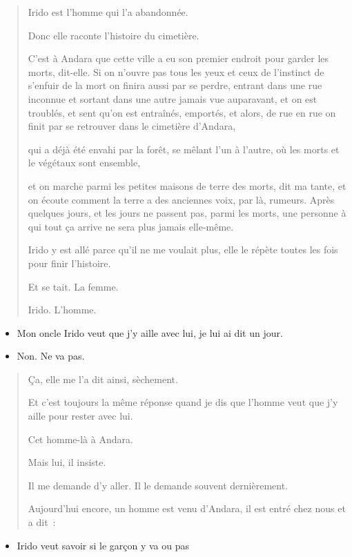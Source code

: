 \begin{quote}
Irido est l'homme qui l'a abandonnée.

Donc elle raconte l'histoire du cimetière.

C'est à Andara que cette ville a eu son premier endroit pour garder les
morts, dit-elle. Si on n'ouvre pas tous les yeux et ceux de l'instinct
de s'enfuir de la mort on finira aussi par se perdre, entrant dans une
rue inconnue et sortant dans une autre jamais vue auparavant, et on est
troublés, et sent qu'on est entraînés, emportés, et alors, de rue en rue
on finit par se retrouver dans le cimetière d'Andara,

qui a déjà été envahi par la forêt, se mêlant l'un à l'autre, où les
morts et le végétaux sont ensemble,

et on marche parmi les petites maisons de terre des morts, dit ma tante,
et on écoute comment la terre a des anciennes voix, par là, rumeurs.
Après quelques jours, et les jours ne passent pas, parmi les morts, une
personne à qui tout ça arrive ne sera plus jamais elle-même.

Irido y est allé parce qu'il ne me voulait plus, elle le répète toutes
les fois pour finir l'histoire.

Et se tait. La femme.

Irido. L'homme.
\end{quote}

\begin{itemize}
\item
  Mon oncle Irido veut que j'y aille avec lui, je lui ai dit un jour.
\item
  Non. Ne va pas.
\end{itemize}

\begin{quote}
Ça, elle me l'a dit ainsi, sèchement.

Et c'est toujours la même réponse quand je dis que l'homme veut que j'y
aille pour rester avec lui.

Cet homme-là à Andara.

Mais lui, il insiste.

Il me demande d'y aller. Il le demande souvent dernièrement.

Aujourd'hui encore, un homme est venu d'Andara, il est entré chez nous
et a dit~:
\end{quote}

\begin{itemize}
\item
  Irido veut savoir si le garçon y va ou pas
\end{itemize}


